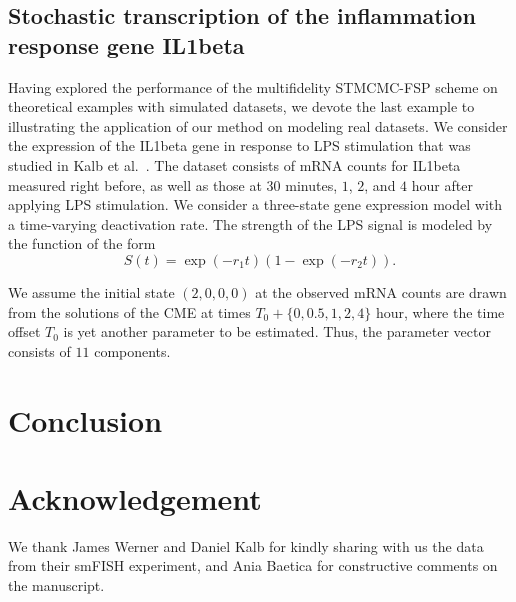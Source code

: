 \documentclass[1p]{article}
\begin{document}
\subsection{Stochastic transcription of the inflammation response gene IL1beta}
Having explored the performance of the multifidelity STMCMC-FSP scheme on theoretical examples with simulated datasets, we devote the last example to illustrating the application of our method on modeling real datasets.
We consider the expression of the IL1beta gene in response to LPS stimulation that was studied in Kalb et al.~\cite{Kalb2019}.
%
The dataset consists of mRNA counts for IL1beta measured right before, as well as those at $30$ minutes, $1$, $2$, and $4$ hour after applying LPS stimulation.
%
We consider a three-state gene expression model with a time-varying deactivation rate.
%
The strength of the LPS signal is modeled by the function of the form
$$
S(t) = \exp(-r_1 t)\left(1 - \exp(-r_2 t)\right).
$$
%

We assume the initial state $(2,0,0,0)$ at the observed mRNA counts are drawn from the solutions of the CME at times $T_0 + \{0, 0.5, 1, 2, 4\}$ hour, where the time offset $T_0$ is yet another parameter to be estimated.
%
Thus, the parameter vector consists of $11$ components.

\section{Conclusion}
\section*{Acknowledgement}
We thank James Werner and Daniel Kalb for kindly sharing with us the data from their smFISH experiment, and Ania Baetica for constructive comments on the manuscript.


\end{document}
